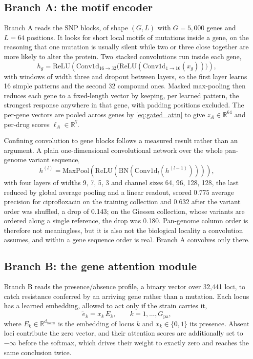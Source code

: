 \documentclass[11pt]{article}
\begin{document}
\subsection{Branch A: the motif encoder}
Branch A reads the SNP blocks, of shape $(G, L)$ with $G = 5{,}000$ genes and $L = 64$ positions.
It looks for short local motifs of mutations inside a gene, on the reasoning that one mutation is
usually silent while two or three close together are more likely to alter the protein. Two stacked
convolutions run inside each gene,
\begin{equation}
h_g = \mathrm{ReLU}\!\left(\mathrm{Conv1d}_{16 \to 32}\big(\mathrm{ReLU}(\mathrm{Conv1d}_{1 \to 16}(x_g))\big)\right),
\label{eq:branchA}
\end{equation}
with windows of width three and dropout between layers, so the first layer learns 16 simple patterns
and the second 32 compound ones. Masked max-pooling then reduces each gene to a fixed-length vector
by keeping, per learned pattern, the strongest response anywhere in that gene, with padding
positions excluded. The per-gene vectors are pooled across genes by \eqref{eq:gated_attn} to give
$z_A \in \mathbb{R}^{64}$ and per-drug scores $\ell_A \in \mathbb{R}^{7}$.

Confining convolution to gene blocks follows a measured result rather than an argument. A plain
one-dimensional convolutional network over the whole pan-genome variant sequence,
\begin{equation}
h^{(l)} = \mathrm{MaxPool}\!\left(\mathrm{ReLU}\!\left(\mathrm{BN}\!\left(\mathrm{Conv1d}_l\!\left(h^{(l-1)}\right)\right)\right)\right),
\label{eq:naive_cnn}
\end{equation}
with four layers of widths 9, 7, 5, 3 and channel sizes 64, 96, 128, 128, the last reduced by global
average pooling and a linear readout, scored 0.775 average precision for ciprofloxacin on the
training collection and 0.632 after the variant order was shuffled, a drop of 0.143; on the Giessen
collection, whose variants are ordered along a single reference, the drop was 0.180. Pan-genome
column order is therefore not meaningless, but it is also not the biological locality a convolution
assumes, and within a gene sequence order is real. Branch A convolves only there.

\subsection{Branch B: the gene attention module}
Branch B reads the presence/absence profile, a binary vector over 32,441 loci, to catch resistance
conferred by an arriving gene rather than a mutation. Each locus has a learned embedding, allowed to
act only if the strain carries it,
\begin{equation}
\tilde{e}_k = x_k \, E_k, \qquad k = 1, \dots, G_{\mathrm{pa}},
\label{eq:branchB_embed}
\end{equation}
where $E_k \in \mathbb{R}^{d_{\mathrm{token}}}$ is the embedding of locus $k$ and
$x_k \in \{0, 1\}$ its presence. Absent loci contribute the zero vector, and their attention scores
are additionally set to $-\infty$ before the softmax, which drives their weight to exactly zero and
reaches the same conclusion twice.
\end{document}
